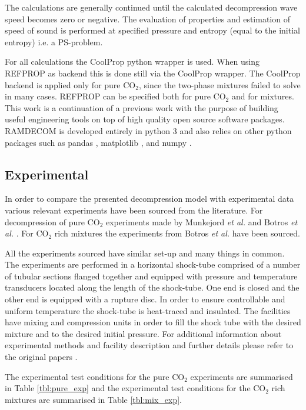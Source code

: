 \documentclass[a4paper, 10pt, twocolumn, twoside]{scrartcl}
\begin{document}
The calculations are generally continued until the calculated decompression wave speed becomes zero or negative. The evaluation of properties and estimation of speed of sound is performed at specified pressure and entropy (equal to the initial entropy) i.e. a PS-problem. 

For all calculations the CoolProp python wrapper is used. When using REFPROP as backend this is done still via the CoolProp wrapper. The CoolProp backend is applied only for pure CO$_2$, since the two-phase mixtures failed to solve in many cases. REFPROP can be specified both for pure CO$_2$ and for mixtures. This work is a continuation of a previous work \cite{Andreasen2021} with the purpose of building useful engineering tools on top of high quality open source software packages. RAMDECOM is developed entirely in python 3 and also relies on other python packages such as pandas \cite{mckinney-proc-scipy-2010}, matplotlib \cite{Hunter:2007}, and numpy \cite{harris2020array}. 



\subsection{Experimental}
In order to compare the presented decompression model with experimental data various relevant experiments have been sourced from the literature. For decompression of pure CO$_2$ experiments made by Munkejord \emph{et al.} \cite{MUNKEJORD2020118560} and Botros \emph{et al.} \cite{Botros_pure}. For CO$_2$ rich mixtures the experiments from Botros \emph{et al.} \cite{Botros_mixture} have been sourced. 

All the experiments sourced have similar set-up and many things in common. The experiments are performed in a horizontal shock-tube comprised of a number of tubular sections flanged together and equipped with pressure and temperature transducers located along the length of the shock-tube. One end is closed and the other end is equipped with a rupture disc. In order to ensure controllable and uniform temperature the shock-tube is heat-traced and insulated. The facilities have mixing and compression units in order to fill the shock tube with the desired mixture and to the desired initial pressure. For additional information about experimental methods and facility description and further details please refer to the original papers \cite{MUNKEJORD2020118560,Botros_pure}.

The experimental test conditions for the pure CO$_2$ experiments are summarised in Table \ref{tbl:pure_exp} and the experimental test conditions for the CO$_2$ rich mixtures are summarised in Table \ref{tbl:mix_exp}.
\end{document}
